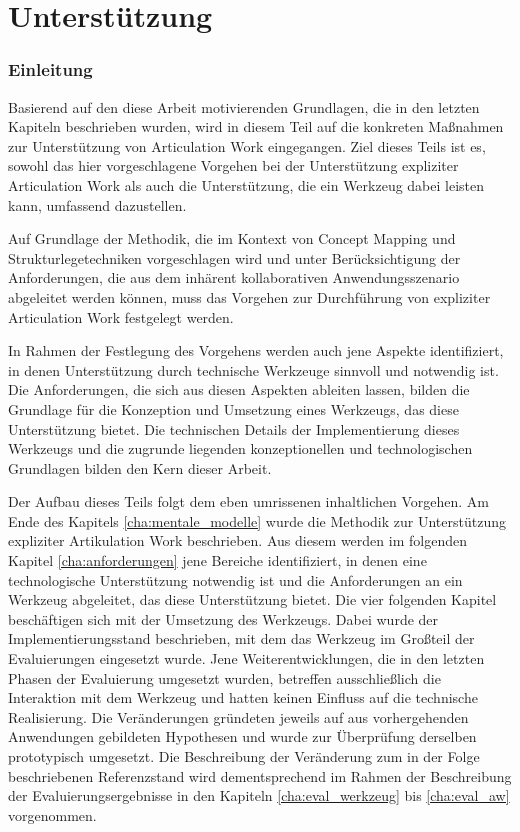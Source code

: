 \part{Unterstützung} %
\label{prt:umsetzung}

\section*{Einleitung} %
\label{sec:umsetzung_einleitung}
\thispagestyle{empty}

Basierend auf den diese Arbeit motivierenden Grundlagen, die in den letzten Kapiteln beschrieben wurden, wird in diesem Teil auf die konkreten Maßnahmen zur Unterstützung von Articulation Work eingegangen. Ziel dieses Teils ist es, sowohl das hier vorgeschlagene Vorgehen bei der Unterstützung expliziter Articulation Work als auch die Unterstützung, die ein Werkzeug dabei leisten kann, umfassend dazustellen.

Auf Grundlage der Methodik, die im Kontext von Concept Mapping und Strukturlegetechniken vorgeschlagen wird und unter Berücksichtigung der Anforderungen, die aus dem inhärent kollaborativen Anwendungsszenario abgeleitet werden können, muss das Vorgehen zur Durchführung von expliziter Articulation Work festgelegt werden. 

In Rahmen der Festlegung des Vorgehens werden auch jene Aspekte identifiziert, in denen Unterstützung durch technische Werkzeuge sinnvoll und notwendig ist. Die Anforderungen, die sich aus diesen Aspekten ableiten lassen, bilden die Grundlage für die Konzeption und Umsetzung eines Werkzeugs, das diese Unterstützung bietet. Die technischen Details der Implementierung dieses Werkzeugs und die zugrunde liegenden konzeptionellen und technologischen Grundlagen bilden den Kern dieser Arbeit.

Der Aufbau dieses Teils folgt dem eben umrissenen inhaltlichen Vorgehen. Am Ende des Kapitels \ref{cha:mentale_modelle} wurde die Methodik zur Unterstützung expliziter Artikulation Work beschrieben. Aus diesem werden im folgenden Kapitel \ref{cha:anforderungen} jene Bereiche identifiziert, in denen eine technologische Unterstützung notwendig ist und die Anforderungen an ein Werkzeug abgeleitet, das diese Unterstützung bietet. Die vier folgenden Kapitel beschäftigen sich mit der Umsetzung des Werkzeugs. Dabei wurde der Implementierungsstand beschrieben, mit dem das Werkzeug im Großteil der Evaluierungen eingesetzt wurde. Jene Weiterentwicklungen, die in den letzten Phasen der Evaluierung umgesetzt wurden, betreffen ausschließlich die Interaktion mit dem Werkzeug und hatten keinen Einfluss auf die technische Realisierung. Die Veränderungen gründeten jeweils auf aus vorhergehenden Anwendungen gebildeten Hypothesen und wurde zur Überprüfung derselben prototypisch umgesetzt. Die Beschreibung der Veränderung zum in der Folge beschriebenen Referenzstand wird dementsprechend im Rahmen der Beschreibung der Evaluierungsergebnisse in den Kapiteln \ref{cha:eval_werkzeug} bis \ref{cha:eval_aw} vorgenommen.

